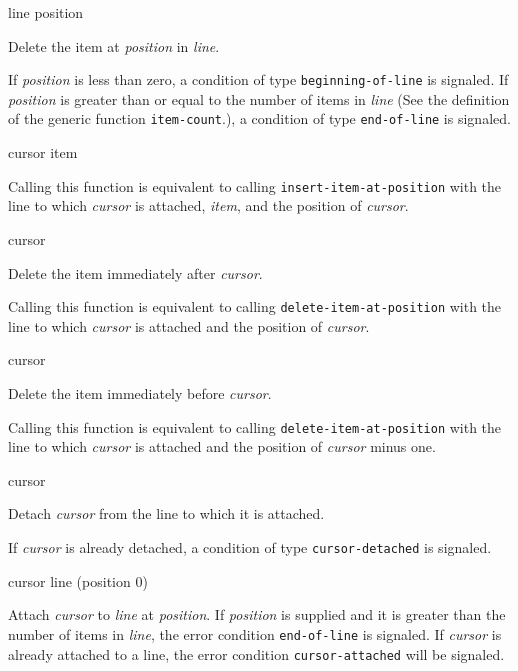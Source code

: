  {line position}

Delete the item at \textit{position} in \textit{line}.

If \textit{position} is less than zero, a condition of type
\texttt{beginning-of-line} is signaled.  If \textit{position} is
greater than or equal to the number of items in \textit{line} (See the
definition of the generic function \texttt{item-count}.), a condition
of type \texttt{end-of-line} is signaled.

 {cursor item}

Calling this function is equivalent to calling
\texttt{insert-item-at-position} with the line to which
\textit{cursor} is attached, \textit{item}, and the position of
\textit{cursor}.  \howeverperformance{}

\ifdetached{}

 {cursor}

Delete the item immediately after \emph{cursor}.

Calling this function is equivalent to calling
\texttt{delete-item-at-position} with the line to which
\textit{cursor} is attached and the position of \textit{cursor}.
\howeverperformance{}

\ifdetached{}

 {cursor}

Delete the item immediately before \emph{cursor}.

Calling this function is equivalent to calling
\texttt{delete-item-at-position} with the line to which
\textit{cursor} is attached and the position of \textit{cursor} minus
one.  \howeverperformance{}

\ifdetached{}

 {cursor}

Detach \textit{cursor} from the line to which it is attached.

If \textit{cursor} is already detached, a condition of type
\texttt{cursor-detached} is signaled.

 {cursor line \optional (position 0)}

Attach \textit{cursor} to \textit{line} at \textit{position}.  If
\textit{position} is supplied and it is greater than the number of
items in \textit{line}, the error condition \texttt{end-of-line} is
signaled.  If \textit{cursor} is already attached to a line, the error
condition \texttt{cursor-attached} will be signaled.

